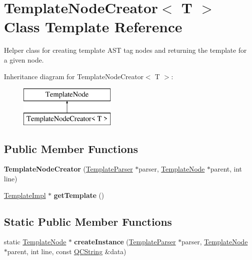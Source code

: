 \hypertarget{class_template_node_creator}{}\section{Template\+Node\+Creator$<$ T $>$ Class Template Reference}
\label{class_template_node_creator}


Helper class for creating template A\+ST tag nodes and returning the template for a given node.  


Inheritance diagram for Template\+Node\+Creator$<$ T $>$\+:\begin{figure}[H]
\begin{center}
\leavevmode
\includegraphics[height=2.000000cm]{class_template_node_creator}
\end{center}
\end{figure}
\subsection*{Public Member Functions}
\begin{DoxyCompactItemize}
\item 
\mbox{\label{class_template_node_creator_a7b699e3738800d14e5c7f506fa2684df}} 
{\bfseries Template\+Node\+Creator} (\mbox{\hyperlink{class_template_parser}{Template\+Parser}} $\ast$parser, \mbox{\hyperlink{class_template_node}{Template\+Node}} $\ast$parent, int line)
\item 
\mbox{\label{class_template_node_creator_a4052c0be982c3a090192053ae608ec2e}} 
\mbox{\hyperlink{class_template_impl}{Template\+Impl}} $\ast$ {\bfseries get\+Template} ()
\end{DoxyCompactItemize}
\subsection*{Static Public Member Functions}
\begin{DoxyCompactItemize}
\item 
\mbox{\label{class_template_node_creator_a8914a8c5da5c6bbba87942cf7135dea5}} 
static \mbox{\hyperlink{class_template_node}{Template\+Node}} $\ast$ {\bfseries create\+Instance} (\mbox{\hyperlink{class_template_parser}{Template\+Parser}} $\ast$parser, \mbox{\hyperlink{class_template_node}{Template\+Node}} $\ast$parent, int line, const \mbox{\hyperlink{class_q_c_string}{Q\+C\+String}} \&data)
\end{DoxyCompactItemize}
